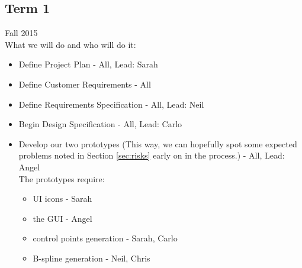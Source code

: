 \documentclass[12pt]{article}
\begin{document}
\subsection{Term 1}
Fall 2015 \\
What we will do and who will do it:
\begin{itemize}
	\item Define Project Plan - All, Lead: Sarah
	\item Define Customer Requirements - All
	\item Define Requirements Specification - All, Lead: Neil
	\item Begin Design Specification - All, Lead: Carlo
	\item Develop our two prototypes (This way, we can hopefully spot some expected problems noted in Section \ref{sec:risks} early on in the process.) - All, Lead: Angel \\
	The prototypes require:
	\begin{itemize} 
		\item UI icons - Sarah
		\item the GUI - Angel
		\item control points generation - Sarah, Carlo
		\item B-spline generation - Neil, Chris
	\end{itemize}
\end{itemize}
\end{document}
